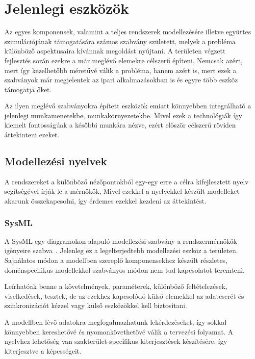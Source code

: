 \section{Jelenlegi eszközök}
Az egyes komponensek, valamint a teljes rendszerek modellezésére illetve együttes szimulációjának támogatására számos
szabvány született, melyek a probléma különböző aspektusaira kívánnak megoldást nyújtani. A területen végzett fejlesztés során
ezekre a már meglévő elemekre célszerű építeni. Nemcsak azért, mert így kezelhetőbb méretűvé válik a probléma, hanem azért is,
mert ezek a szabványok már megjelentek az ipari alkalmazásokban is és egyre több eszköz támogatja őket.

Az ilyen meglévő szabványokra épített eszközök emiatt könnyebben integrálható a jelenlegi munkamenetekbe,
munkakörnyezetekbe. Mivel ezek a technológiák így kiemelt fontosságúak a későbbi munkára nézve, ezért
először célszerű röviden áttekinteni ezeket.

    \subsection{Modellezési nyelvek}
    A rendszereket a különböző nézőpontokból egy-egy erre a célra kifejlesztett nyelv segítségével írják le a mérnökök,
    Mivel ezekkel a nyelvekkel készült modelleket akarunk összekapcsolni, így érdemes ezekkel kezdeni az áttekintést.
        
        \subsubsection{SysML}
        A SysML egy diagramokon alapuló modellezési szabvány a rendszermérnökök igényeire szabva~\cite{Bajaj_2022}.
        Jelenleg ez a legelterjedtebb modellezési eszköz a területen. Sajnálatos módon a modellben szereplő
        komponensekhez készült részletes, doménspecifikus modellekkel szabványos módon nem tud kapcsolatot teremteni.
        
        Leírhatóak benne a követelmények, paraméterek, különböző feltételezések, viselkedések, tesztek, de az
        ezekhez kapcsolódó külső elemekkel az adatcserét és szinkronizációt kézzel vagy külső eszközökkel
        kell biztosítani.
        
        A modellben lévő adatokra megfogalmazhatunk lekérdezéseket, így sokkal
        könnyebben kereshetővé és nyomonkövethetővé válik a tervezési folyamat. A nyelvhez lehetőség van
        szakterület-specifikus kiterjesztések készítésére, így kiterjesztve a képességeit.

